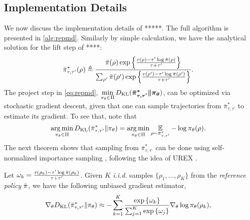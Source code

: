 \subsection{Implementation Details}
\label{subsec:implementation}
We now discuss the implementation details of *****. The full algorithm is presented in \cref{alg:repmd}.
Similarly by simple calculation, we have the analytical solution for the lift step of ****:
\begin{equation*}
\bar{\pi}_{\tau,\tau^{\prime}}^*(\rho) \triangleq \frac{\bar{\pi}(\rho) \exp\left\{ \frac{r(\rho)-\tau^{\prime} \log \bar{\pi}(\rho) }{ \tau+\tau^{\prime}} \right\}}{ \sum_{\rho^{\prime}}{\bar{\pi}(\rho^{\prime}) \exp\left\{ \frac{r(\rho^{\prime})-\tau^{\prime} \log \bar{\pi}(\rho^{\prime})}{ \tau+\tau^{\prime}} \right\} } }.
\end{equation*}
The project step in \cref{eq:repmd}, $\min\limits_{\pi_\theta \in \Pi}{D_{\mathrm{KL}}(\bm{ \bar{\pi}_{\tau,\tau^{\prime}}^* \| \pi_\theta }) }$, can be optimized via stochastic gradient descent, given that one can sample trajectories from $\bar{\pi}_{\tau,\tau^{\prime}}^*$ to estimate its gradient.
To see that, note that 
\begin{equation*}
\operatorname*{arg\,min}\limits_{\pi_\theta \in \Pi}D_{\mathrm{KL}}(\bar{\pi}_{\tau,\tau^{\prime}}^* \| \pi_\theta) = \operatorname*{arg\,min}\limits_{\pi_\theta \in \Pi} \operatorname*{\mathbb{E}}_{\rho \sim \bar{\pi}_{\tau,\tau^{\prime}}^* }  - \log \pi_\theta(\rho).
\end{equation*}
The next theorem shows that sampling from $\bar{\pi}_{\tau,\tau^{\prime}}^*$ can be done using self-normalized importance sampling \citep{owen2013monte}, following the idea of UREX \citep{nachum2017improving}.
\begin{thm}
\label{thm:repmdgradientestimate}
Let $\omega_k = \frac{r(\rho_k) - \tau^{\prime} \log{\bar{\pi}(\rho_k)} }{\tau + \tau^{\prime}}$. Given $K$ \emph{i.i.d.} samples $\{\rho_1, \dots, \rho_K\}$ from the \emph{reference policy} $\bar{\pi}$, we have the following unbiased gradient estimator,
\begin{equation}
\label{eq:gradient_estimator}
	\nabla_{\theta} D_{\mathrm{KL}}(\bar{\pi}_{\tau,\tau^{\prime}}^* \| \pi_\theta)\approx -\sum\limits_{k=1}^K{ \frac{ \exp\left\{ \omega_k \right\} }{ \sum_{j=1}^K{ \exp\left\{ \omega_j \right\}}} \nabla_{\theta} \log{\pi_\theta(\rho_k)} },
\end{equation}
\end{thm}

